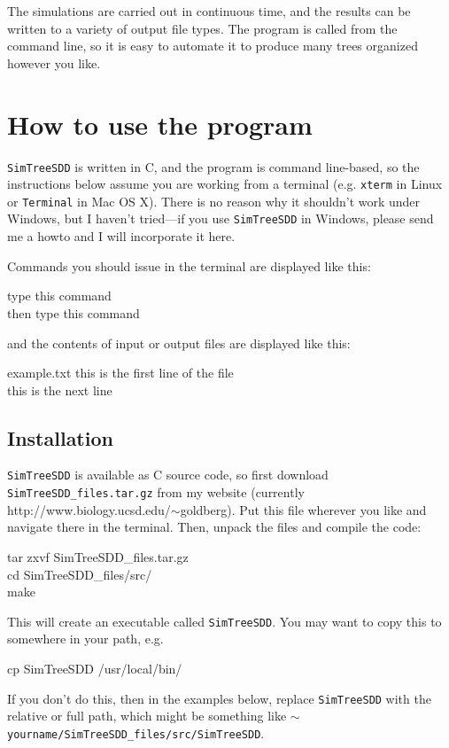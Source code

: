 \documentclass[10pt]{article}
\begin{document}
The simulations are carried out in continuous time, and the results can be written to a variety of output file types.  The program is called from the command line, so it is easy to automate it to produce many trees organized however you like.


\section*{How to use the program}

\texttt{SimTreeSDD} is written in C, and the program is command line-based, so the instructions below assume you are working from a terminal (e.g. \texttt{xterm} in Linux or \texttt{Terminal} in Mac OS X).
There is no reason why it shouldn't work under Windows, but I haven't tried---if you use \texttt{SimTreeSDD} in Windows, please send me a howto and I will incorporate it here.

Commands you should issue in the terminal are displayed like this:
\begin{commandis}
	type this command \\
	then type this command
\end{commandis}
and the contents of input or output files are displayed like this:
\begin{filesays}{example.txt}
	this is the first line of the file \\
	this is the next line
\end{filesays}


\subsection*{Installation}

\texttt{SimTreeSDD} is available as C source code, so first download \texttt{SimTreeSDD\_files.tar.gz} from my website (currently http://www.biology.ucsd.edu/$\sim$goldberg).  Put this file wherever you like and navigate there in the terminal.  Then, unpack the files and compile the code:
\begin{commandis}
	tar zxvf SimTreeSDD\_files.tar.gz	\\
	cd SimTreeSDD\_files/src/		\\
	make
\end{commandis}
This will create an executable called \texttt{SimTreeSDD}.  You may want to copy this to somewhere in your path, e.g.
\begin{commandis}
	cp SimTreeSDD /usr/local/bin/
\end{commandis}
If you don't do this, then in the examples below, replace \texttt{SimTreeSDD} with the relative or full path, which might be something like \texttt{$\sim$yourname/SimTreeSDD\_files/src/SimTreeSDD}.
\end{document}
